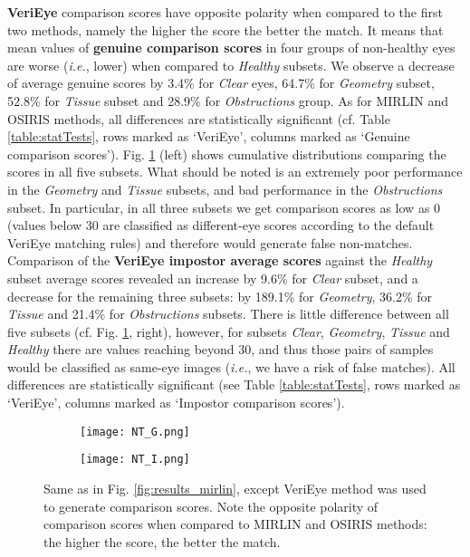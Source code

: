 \documentclass[conference]{IEEEtran}
\begin{document}
{\bf VeriEye} comparison scores have opposite polarity when compared to the first two methods, namely the higher the score the better the match. It means that mean values of {\bf genuine comparison scores} in four groups of non-healthy eyes are worse (\emph{i.e.}, lower) when compared to \emph{Healthy} subsets. We observe a decrease of average genuine scores by 3.4\% for \emph{Clear} eyes, 64.7\% for \emph{Geometry} subset, 52.8\% for \emph{Tissue} subset and 28.9\% for \emph{Obstructions} group. As for MIRLIN and OSIRIS methods, all differences are statistically significant (cf. Table \ref{table:statTests}, rows marked as `VeriEye', columns marked as `Genuine comparison scores'). Fig. \ref{fig:results_neuro} (left) shows cumulative distributions comparing the scores in all five subsets. What should be noted is an extremely poor performance in the \emph{Geometry} and \emph{Tissue} subsets, and bad performance in the \emph{Obstructions} subset. In particular, in all three subsets we get comparison scores as low as 0 (values below 30 are classified as different-eye scores according to the default VeriEye matching rules) and therefore would generate false non-matches. Comparison of the {\bf VeriEye impostor average scores} against the \emph{Healthy} subset average scores revealed an increase by 9.6\% for \emph{Clear} subset, and a decrease for the remaining three subsets: by 189.1\% for \emph{Geometry}, 36.2\% for \emph{Tissue} and 21.4\% for \emph{Obstructions} subsets. There is little difference between all five subsets (cf. Fig. \ref{fig:results_neuro}, right), however, for subsets \emph{Clear}, \emph{Geometry}, \emph{Tissue} and \emph{Healthy} there are values reaching beyond 30, and thus those pairs of samples would be classified as same-eye images (\emph{i.e.}, we have a risk of false matches). All differences are statistically significant (see Table \ref{table:statTests}, rows marked as `VeriEye', columns marked as `Impostor comparison scores').

\begin{figure}[!htb]
\centering
\begin{subfigure}{0.25\textwidth}
  \centering
  \texttt{[image: NT\_G.png]}
\end{subfigure}%
\begin{subfigure}{0.25\textwidth}
  \centering
  \texttt{[image: NT\_I.png]}
\end{subfigure}
\caption{Same as in Fig. \ref{fig:results_mirlin}, except VeriEye method was used to generate comparison scores. Note the opposite polarity of comparison scores when compared to MIRLIN and OSIRIS methods: the higher the score, the better the match.}
\label{fig:results_neuro}
\end{figure} 
\end{document}
